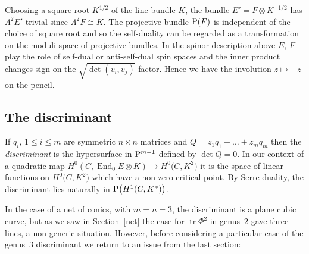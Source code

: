 \documentclass[10pt,a4paper]{amsart}
\numberwithin{equation}{section}
\begin{document}
\begin{Remark}
 Choosing a square root $K^{1/2}$ of the line bundle $K$, the bundle $E'=F\otimes K^{-1/2}$ has $\Lambda^2E'$ trivial since $\Lambda^2F\cong K$. The projective bundle ${\rm P}(F)$ is independent of the choice of square root and so the self-duality can be regarded as a transformation on the moduli space of projective bundles. In the spinor description above $E$, $F$ play the role of self-dual or anti-self-dual spin spaces and the inner product changes sign on the $\sqrt{\det(v_i,v_j)}$ factor. Hence we have the involution
$z\mapsto -z$ on the pencil.
\end{Remark}

\subsection{The discriminant}
If $q_i$, $1\le i\le m$ are symmetric $n\times n$ matrices and $Q=z_1q_1+\dots + z_mq_m$ then the {\it discriminant} is the hypersurface in ${\rm P}^{m-1}$ defined by $\det Q=0$. In our context of a quadratic map $H^0(C,\operatorname{End}_0E\otimes K)\rightarrow H^0\big(C,K^2\big)$ it is the space of linear functions on $H^0\big(C,K^2\big)$ which have a non-zero critical point. By Serre duality, the discriminant lies naturally in ${\rm P}\big(H^1(C,K^*)\big)$.

In the case of a net of conics, with $m=n=3$, the discriminant is a plane cubic curve, but as we saw in Section~\ref{net} the case for $\operatorname{tr} \Phi^2$ in genus~$2$ gave three lines, a non-generic situation. However, before considering a particular case of the genus~$3$ discriminant
 we return to an issue from the last section:
\end{document}
